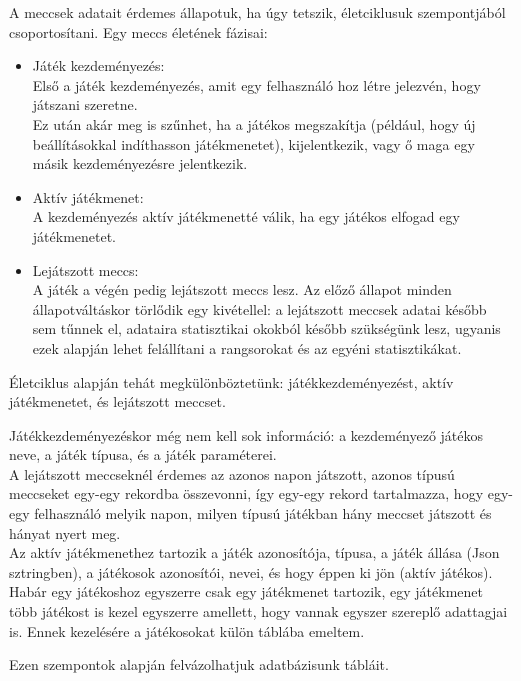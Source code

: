 A meccsek adatait érdemes állapotuk, ha úgy tetszik, életciklusuk szempontjából csoportosítani. Egy meccs életének fázisai:
\begin{itemize}
	\item Játék kezdeményezés:\\
	Első a játék kezdeményezés, amit egy felhasználó hoz létre jelezvén, hogy játszani szeretne.\\
	Ez után akár meg is szűnhet, ha a játékos megszakítja (például, hogy új beállításokkal indíthasson játékmenetet), kijelentkezik, vagy ő maga egy másik kezdeményezésre jelentkezik.\\
	\item Aktív játékmenet:\\
	A kezdeményezés aktív játékmenetté válik, ha egy játékos elfogad egy játékmenetet.\\
	\item Lejátszott meccs:\\
	A játék a végén pedig lejátszott meccs lesz. Az előző állapot minden állapotváltáskor törlődik egy kivétellel: a lejátszott meccsek adatai később sem tűnnek el, adataira statisztikai okokból később szükségünk lesz, ugyanis ezek alapján lehet felállítani a rangsorokat és az egyéni statisztikákat.
\end{itemize}
Életciklus alapján tehát megkülönböztetünk: játékkezdeményezést, aktív játékmenetet, és lejátszott meccset.

Játékkezdeményezéskor még nem kell sok információ: a kezdeményező játékos neve, a játék típusa, és a játék paraméterei.\\
A lejátszott meccseknél érdemes az azonos napon játszott, azonos típusú meccseket egy-egy rekordba összevonni, így egy-egy rekord tartalmazza, hogy egy-egy felhasználó melyik napon, milyen típusú játékban hány meccset játszott és hányat nyert meg.\\
Az aktív játékmenethez tartozik a játék azonosítója, típusa, a játék állása (Json sztringben), a játékosok azonosítói, nevei, és hogy éppen ki jön (aktív játékos). Habár egy játékoshoz egyszerre csak egy játékmenet tartozik, egy játékmenet több játékost is kezel egyszerre amellett, hogy vannak egyszer szereplő adattagjai is. Ennek kezelésére a játékosokat külön táblába emeltem.

Ezen szempontok alapján felvázolhatjuk adatbázisunk tábláit.

